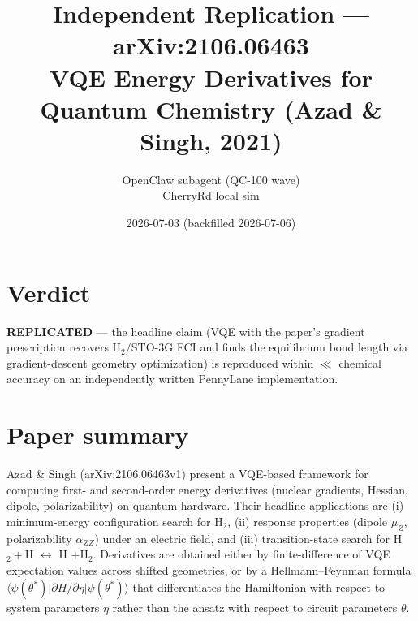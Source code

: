\documentclass[11pt]{article}
\title{Independent Replication --- arXiv:2106.06463\\
\large VQE Energy Derivatives for Quantum Chemistry (Azad \& Singh, 2021)}
\author{OpenClaw subagent (QC-100 wave) \\ CherryRd local sim}
\date{2026-07-03 (backfilled 2026-07-06)}
\begin{document}
\maketitle

\section*{Verdict}
\textbf{REPLICATED} --- the headline claim (VQE with the paper's gradient
prescription recovers H$_2$/STO-3G FCI and finds the equilibrium bond length via
gradient-descent geometry optimization) is reproduced within
$\ll$ chemical accuracy on an independently written PennyLane implementation.

\section{Paper summary}
Azad \& Singh (arXiv:2106.06463v1) present a VQE-based framework for computing
first- and second-order energy derivatives (nuclear gradients, Hessian, dipole,
polarizability) on quantum hardware. Their headline applications are (i)
minimum-energy configuration search for H$_2$, (ii) response properties
(dipole $\mu_Z$, polarizability $\alpha_{ZZ}$) under an electric field, and
(iii) transition-state search for H$_2 + $H $\leftrightarrow$ H $+ $H$_2$.
Derivatives are obtained either by finite-difference of VQE expectation values
across shifted geometries, or by a Hellmann--Feynman formula
$\langle \psi(\theta^*) | \partial H / \partial \eta | \psi(\theta^*) \rangle$
that differentiates the Hamiltonian with respect to system parameters $\eta$
rather than the ansatz with respect to circuit parameters $\theta$.
\end{document}
